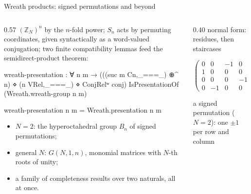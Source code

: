 \begin{frame}{Wreath products: signed permutations and beyond \InPaper}
\begin{columns}[c]
\begin{column}{0.57\textwidth}
$(\mathbb{Z}_N)^n$ by the $n$-fold power; $S_n$ acts by permuting coordinates,
given \alert{syntactically} as a word-valued conjugation; two finite
compatibility lemmas feed the semidirect-product theorem:
\begin{code}
wreath-presentation : ∀ n m →
  (((suc m Cn,_===_) ⊕^ n) ⋄ (n VRel,_===_) ⋄ ConjRelʷ conj)
    IsPresentationOf (Wreath.wreath-group n m)
\end{code}
\begin{code}[hide]
wreath-presentation n m = Wreath.presentation n m
\end{code}
\begin{itemize}
  \small
  \item $N=2$: the hyperoctahedral group $B_n$ of \alert{signed permutations};
  \item general $N$: $G(N,1,n)$, monomial matrices with $N$-th roots of unity;
  \item a family of completeness results over \alert{two naturals}, all at once.
\end{itemize}
\end{column}
\begin{column}{0.40\textwidth}
\centering
{\small normal form: residues, then staircases}\\[4pt]

\vspace{8pt}
$\begin{pmatrix} 0 & 0 & -1 & 0\\ 1 & 0 & 0 & 0\\ 0 & 0 & 0 & -1\\ 0 & -1 & 0 & 0\end{pmatrix}\in B_4$

{\scriptsize a signed permutation ($N=2$): one $\pm1$ per row and column}
\end{column}
\end{columns}
\end{frame}

